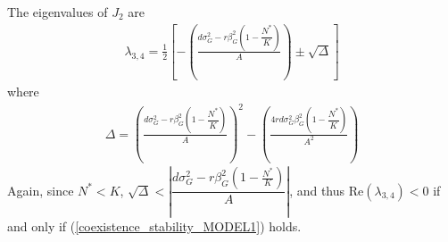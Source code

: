 \documentclass{amsart}
\theoremstyle{definition}
\theoremstyle{remark}
\numberwithin{equation}{section}
\begin{document}
\noindent The eigenvalues of $J_2$ are
\begin{align*}
	\lambda_{3,4} = \frac{1}{2}\left[-\left(\frac{d\sigma_G^2 - r\beta_G^2\left(1 - \dfrac{N^*}{K}\right)}{A}\right) \pm \sqrt{\Delta}\right]
\end{align*}
where
\begin{align*}
	\Delta = \left(\frac{d\sigma_G^2 - r\beta_G^2\left(1 - \dfrac{N^*}{K}\right)}{A}\right)^2 - \left(\frac{4rd\sigma_G^2\beta_G^2\left(1 - \dfrac{N^*}{K}\right)}{A^2}\right)
\end{align*}
Again, since $N^* < K$, $\sqrt{\Delta} < \left|\dfrac{d\sigma_G^2 - r\beta_G^2\left(1 - \frac{N^*}{K}\right)}{A}\right|$, and thus $\text{Re}(\lambda_{3,4}) < 0$ if and only if (\ref{coexistence_stability_MODEL1}) holds.




































\pagebreak
\end{document}
